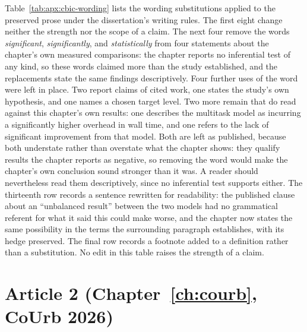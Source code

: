 Table~\ref{tab:apx:cbic-wording} lists the wording substitutions applied to the
preserved prose under the dissertation's writing rules. The first eight change neither
the strength nor the scope of a claim. The next four remove the words
\emph{significant}, \emph{significantly}, and \emph{statistically} from four statements
about the chapter's own measured comparisons: the chapter reports no inferential test of
any kind, so these words claimed more than the study established, and the replacements
state the same findings descriptively. Four further uses of the word were left in place.
Two report claims of cited work, one states the study's own hypothesis, and one names a
chosen target level. Two more remain that do read against this chapter's own results:
one describes the multitask model as incurring a significantly higher overhead in wall
time, and one refers to the lack of significant improvement from that model. Both are
left as published, because both understate rather than overstate what the chapter shows:
they qualify results the chapter reports as negative, so removing the word would make the
chapter's own conclusion sound stronger than it was. A reader should nevertheless read
them descriptively, since no inferential test supports either. The thirteenth row records a
sentence rewritten for readability: the published clause about an ``unbalanced result'' between
the two models had no grammatical referent for what it said this could make worse, and the
chapter now states the same possibility in the terms the surrounding paragraph establishes,
with its hedge preserved. The final row records a footnote added to a definition rather than
a substitution. No edit in this table raises the strength of a claim.



\section{Article 2 (Chapter~\ref{ch:courb}, CoUrb 2026)}
\label{apx:errata:courb}

